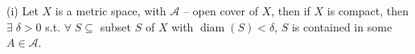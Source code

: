 \documentclass{article}
\begin{document}
\noindent (i) Let $X$ is a metric space, with $\mathcal{A}$ -- open cover of $X$, then if $X$ is compact, then $\exists \; \delta > 0$ s.t. $\forall \; S \subseteq$ subset $S$ of $X$ with $\operatorname{diam}(S) < \delta$, $S$ is contained in some $A \in \mathcal{A}$.
\end{document}
